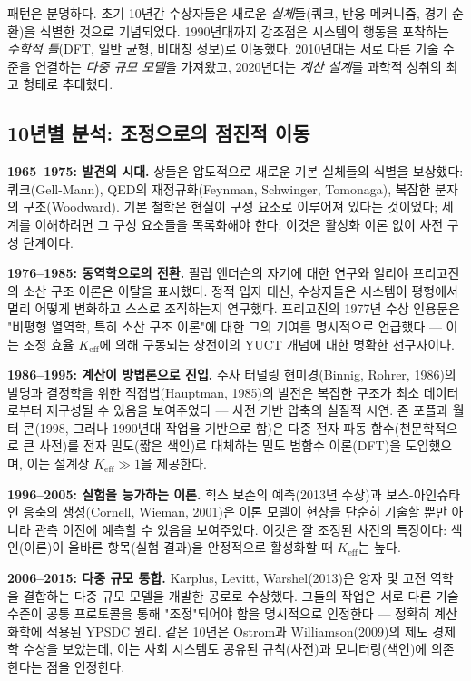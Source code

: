 \documentclass[12pt,a4paper]{article}
\begin{document}
	패턴은 분명하다. 초기 10년간 수상자들은 새로운 \emph{실체}들(쿼크, 반응 메커니즘, 경기 순환)을 식별한 것으로 기념되었다. 1990년대까지 강조점은 시스템의 행동을 포착하는 \emph{수학적 틀}(DFT, 일반 균형, 비대칭 정보)로 이동했다. 2010년대는 서로 다른 기술 수준을 연결하는 \emph{다중 규모 모델}을 가져왔고, 2020년대는 \emph{계산 설계}를 과학적 성취의 최고 형태로 추대했다.
	
	\subsection{10년별 분석: 조정으로의 점진적 이동}
	
	\textbf{1965–1975: 발견의 시대.} 상들은 압도적으로 새로운 기본 실체들의 식별을 보상했다: 쿼크(Gell-Mann), QED의 재정규화(Feynman, Schwinger, Tomonaga), 복잡한 분자의 구조(Woodward). 기본 철학은 현실이 구성 요소로 이루어져 있다는 것이었다; 세계를 이해하려면 그 구성 요소들을 목록화해야 한다. 이것은 활성화 이론 없이 사전 구성 단계이다.
	
	\textbf{1976–1985: 동역학으로의 전환.} 필립 앤더슨의 자기에 대한 연구와 일리야 프리고진의 소산 구조 이론은 이탈을 표시했다. 정적 입자 대신, 수상자들은 시스템이 평형에서 멀리 어떻게 변화하고 스스로 조직하는지 연구했다. 프리고진의 1977년 수상 인용문은 "비평형 열역학, 특히 소산 구조 이론"에 대한 그의 기여를 명시적으로 언급했다 — 이는 조정 효율 \(K_{\mathrm{eff}}\)에 의해 구동되는 상전이의 YUCT 개념에 대한 명확한 선구자이다.
	
	\textbf{1986–1995: 계산이 방법론으로 진입.} 주사 터널링 현미경(Binnig, Rohrer, 1986)의 발명과 결정학을 위한 직접법(Hauptman, 1985)의 발전은 복잡한 구조가 최소 데이터로부터 재구성될 수 있음을 보여주었다 — 사전 기반 압축의 실질적 시연. 존 포플과 월터 콘(1998, 그러나 1990년대 작업을 기반으로 함)은 다중 전자 파동 함수(천문학적으로 큰 사전)를 전자 밀도(짧은 색인)로 대체하는 밀도 범함수 이론(DFT)을 도입했으며, 이는 설계상 \(K_{\mathrm{eff}} \gg 1\)을 제공한다.
	
	\textbf{1996–2005: 실험을 능가하는 이론.} 힉스 보손의 예측(2013년 수상)과 보스-아인슈타인 응축의 생성(Cornell, Wieman, 2001)은 이론 모델이 현상을 단순히 기술할 뿐만 아니라 관측 이전에 예측할 수 있음을 보여주었다. 이것은 잘 조정된 사전의 특징이다: 색인(이론)이 올바른 항목(실험 결과)을 안정적으로 활성화할 때 \(K_{\mathrm{eff}}\)는 높다.
	
	\textbf{2006–2015: 다중 규모 통합.} Karplus, Levitt, Warshel(2013)은 양자 및 고전 역학을 결합하는 다중 규모 모델을 개발한 공로로 수상했다. 그들의 작업은 서로 다른 기술 수준이 공통 프로토콜을 통해 "조정"되어야 함을 명시적으로 인정한다 — 정확히 계산 화학에 적용된 YPSDC 원리. 같은 10년은 Ostrom과 Williamson(2009)의 제도 경제학 수상을 보았는데, 이는 사회 시스템도 공유된 규칙(사전)과 모니터링(색인)에 의존한다는 점을 인정한다.
	
\end{document}

